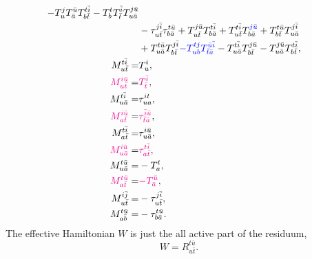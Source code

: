 \documentclass[a4paper,12pt,oneside]{book}
\newcommand{\blue}[1]{{\color{blue} #1}}
\newcommand{\magenta}[1]{{\color{magenta} #1}}
\newcommand{\spa}[1]{{#1}}
\newcommand{\spb}[1]{\bar{#1}}
\begin{document}
\begin{align}
                                      -T^{\spa{j}}_{\spa{u}} T^{\spb{u}}_{\spb{a}} T^{\spa{t}\spb{i}}_{\spa{b}\spb{t}}
                                      -T^{\spa{t}}_{\spa{b}} T^{\spb{i}}_{\spb{t}} T^{\spa{j}\spb{u}}_{\spa{u}\spb{a}} \nonumber \\
                                     &-\tau^{\spa{j}\spb{i}}_{\spa{u}\spb{t}} \tau^{\spa{t}\spb{u}}_{\spa{b}\bar{a}}
                                      +T^{\spa{j}\spb{u}}_{\spa{u}\spb{t}} T^{\spa{t}\spb{i}}_{\spa{b}\spb{a}}
                                      +T^{\spa{t}\spb{i}}_{\spa{u}\spb{t}} T^{\blue{\spa{j}\spb{u}}}_{\spa{b}\spb{a}} 
                                      +T^{\spa{t}\spb{u}}_{\spa{b}\spb{t}} T^{\spa{j}\spb{i}}_{\spa{u}\spb{a}} \nonumber \\
                                     &+T^{\spa{t}\spb{u}}_{\spa{u}\spb{a}} T^{\spa{j}\spb{i}}_{\spa{b}\spb{t}} 
                                \blue{-T^{\spa{t}\spa{j}}_{\spa{u}\spa{b}} T^{\spb{u}\spb{i}}_{\spb{t}\spb{a}}}
                                      -T^{\spa{t}\spb{i}}_{\spa{u}\spb{a}} T^{\spa{j}\spb{u}}_{\spa{b}\spb{t}} 
                                      -T^{\spa{j}\spb{u}}_{\spa{u}\spb{a}} T^{\spa{t}\spb{i}}_{\spa{b}\spb{t}},\\
M^{\spa{t}\spb{i}}_{\spa{u}\spb{t}} = &T^{\spa{i}}_{\spa{u}},\\
\magenta{M^{\spa{i}\spb{u}}_{\spa{u}\spb{t}}} = &\magenta{T^{\spb{i}}_{\spb{t}}}, \\
M^{\spa{t}\spb{i}}_{\spa{u}\spb{a}} = &\tau^{\spa{i}\spa{t}}_{\spa{u}\spa{a}}, \\
\magenta{M^{\spa{i}\spb{u}}_{\spa{a}\spb{t}}} = &\magenta{\tau^{\spb{i}\spb{u}}_{\spb{t}\spb{a}}}, \\
M^{\spa{t}\spb{i}}_{\spa{a}\spb{t}} = &\tau^{\spa{i}\spb{u}}_{\spa{u}\spb{a}}, \\
\magenta{M^{\spa{i}\spb{u}}_{\spa{u}\spb{a}}} = &\magenta{\tau^{\spa{t}\spb{i}}_{\spa{a}\spb{t}}},\\
M^{\spa{t}\spb{u}}_{\spa{u}\spb{a}} = &-T^{\spa{t}}_{\spa{a}},\\
\magenta{M^{\spa{t}\spb{u}}_{\spa{a}\spb{t}}} = &\magenta{-T^{\spb{u}}_{\spb{a}}},\\
M^{\spa{i}\spb{j}}_{\spa{u}\spb{t}} = &-\tau^{\spa{j}\spb{i}}_{\spa{u}\spb{t}}, \\
M^{\spa{t}\spb{u}}_{\spa{a}\spb{b}} = &-\tau^{\spa{t}\spb{u}}_{\spa{b}\spb{a}}.
\end{align}
The effective Hamiltonian $W$ is just the all active part of the residuum,
\begin{equation}
W = R^{\spa{t}\spb{u}}_{\spa{u}\spb{t}}.
\end{equation}



\end{document}
